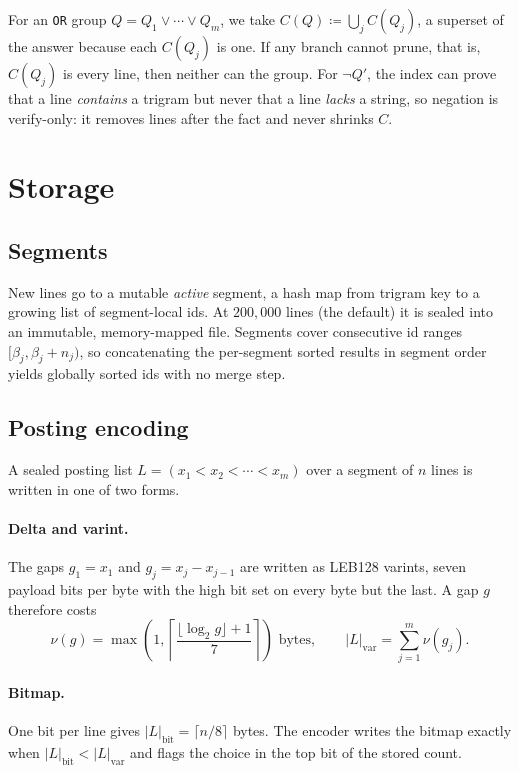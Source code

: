 \documentclass[11pt]{article}
\theoremstyle{plain}
\theoremstyle{definition}
\theoremstyle{remark}
\newcommand{\code}[1]{\texttt{#1}}
\newcommand{\abs}[1]{\left\lvert #1 \right\rvert}
\begin{document}
For an \code{OR} group $Q = Q_1 \vee \cdots \vee Q_m$, we take
$C(Q) \coloneqq \bigcup_j C(Q_j)$, a superset of the answer because each
$C(Q_j)$ is one. If any branch cannot prune, that is, $C(Q_j)$ is every line,
then neither can the group. For $\neg Q'$, the index can prove that a line
\emph{contains} a trigram but never that a line \emph{lacks} a string, so
negation is verify-only: it removes lines after the fact and never shrinks $C$.

\section{Storage}\label{sec:storage}

\subsection{Segments}

New lines go to a mutable \emph{active} segment, a hash map from trigram key to
a growing list of segment-local ids. At $200{,}000$ lines (the default) it is
sealed into an immutable, memory-mapped file. Segments cover consecutive id
ranges $[\beta_j, \beta_j + n_j)$, so concatenating the per-segment sorted results
in segment order yields globally sorted ids with no merge step.

\subsection{Posting encoding}

A sealed posting list $L = (x_1 < x_2 < \cdots < x_m)$ over a segment of $n$
lines is written in one of two forms.

\paragraph{Delta and varint.} The gaps $g_1 = x_1$ and $g_j = x_j - x_{j-1}$ are
written as LEB128 varints, seven payload bits per byte with the high bit set on
every byte but the last. A gap $g$ therefore costs
\begin{equation}
  \nu(g) = \max\!\left(1, \left\lceil \frac{\lfloor \log_2 g \rfloor + 1}{7} \right\rceil\right)
  \text{ bytes}, \qquad
  \abs{L}_{\text{var}} = \sum_{j=1}^{m} \nu(g_j).
\end{equation}

\paragraph{Bitmap.} One bit per line gives
$\abs{L}_{\text{bit}} = \lceil n / 8 \rceil$ bytes. The encoder writes the bitmap
exactly when $\abs{L}_{\text{bit}} < \abs{L}_{\text{var}}$ and flags the choice
in the top bit of the stored count.
\end{document}
